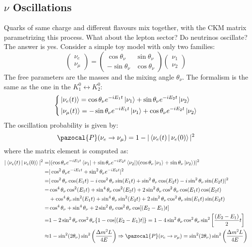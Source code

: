 \documentclass[10.75pt,a4paper,openright,bottom=2cm]{article}
\begin{document}
\subsection{$\nu$ Oscillations}
Quarks of same charge and different flavours mix together, with the CKM matrix parametrizing this process. What about the lepton sector? Do neutrinos oscillate? The answer is yes. Consider a simple toy model with only two families:
\[
\begin{pmatrix}
    \nu_e\\ \nu_\mu
\end{pmatrix}=\begin{pmatrix}
    \cos\theta_\nu & \sin\theta_\nu\\
    -\sin\theta_\nu & \cos\theta_\nu
\end{pmatrix}\begin{pmatrix}
    \nu_1 \\ \nu_2
\end{pmatrix}
\]
The free parameters are the masses and the mixing angle $\theta_\nu$. The formalism is the same as the one in the $K_1^0\leftrightarrow K_2^0$:
\[
\left\{
\begin{aligned}
&\ket{\nu_e(t)}=\cos\theta_\nu e^{-iE_1t}\ket{\nu_1}+\sin\theta_\nu e^{-iE_2t}\ket{\nu_2}\\
&\ket{\nu_\mu(t)}=-\sin\theta_\nu e^{-iE_1t}\ket{\nu_1}+\cos\theta_\nu e^{-iE_2t}\ket{\nu_2}
\end{aligned}
\right.
\]
The oscillation probability is given by:
\[
\pazocal{P}(\nu_e\to\nu_\mu)=1-|\Braket{\nu_e(t)|\nu_e(0)}|^2
\]
where the matrix element is computed as:
\begin{align*}
|\Braket{\nu_e(t)|\nu_e(0)}|^2=&|(\cos\theta_\nu e^{-iE_1t}\bra{\nu_1}+\sin\theta_\nu e^{-iE_2t}\bra{\nu_2})(\cos\theta_\nu\ket{\nu_1}+\sin\theta_\nu\ket{\nu_2})|^2\\
=&|\cos^2\theta_\nu e^{-iE_1t}+\sin^2\theta_\nu e^{-iE_2t}|^2\\
=&|\cos^2\theta_\nu\cos(E_1t)-i\cos^2\theta_\nu\sin(E_1t)+\sin^2\theta_\nu\cos(E_2t)-i\sin^2\theta_\nu\sin(E_2t)|^2\\
=&\cos^4\theta_\nu\cos^2(E_1t)+\sin^4\theta_\nu\cos^2(E_2t)+2\sin^2\theta_\nu\cos^2\theta_\nu\cos(E_1t)\cos(E_2t)\\
&+\cos^4\theta_\nu\sin^2(E_1t)+\sin^4\theta_\nu\sin^2(E_2t)+2\sin^2\theta_\nu\cos^2\theta_\nu\sin(E_1t)\sin(E_2t)\\
=&\cos^4\theta_\nu+\sin^4\theta_\nu+2\sin^2\theta_\nu\cos^2\theta_\nu\cos[(E_2-E_1)t]\\
=&1-2\sin^2\theta_\nu\cos^2\theta_\nu\{1-\cos[(E_2-E_1)t]\}=1-4\sin^2\theta_\nu\cos^2\theta_\nu\sin^2\left[\frac{(E_2-E_1)}{2}t\right]\\
\approx&1-\sin^2(2\theta_\nu)\sin^2\left(\frac{\Delta m^2L}{4E}\right)\Rightarrow\pazocal{P}(\nu_e\to\nu_\mu)=\sin^2(2\theta_\nu)\sin^2\left(\frac{\Delta m^2L}{4E}\right)
\end{align*}
\end{document}
